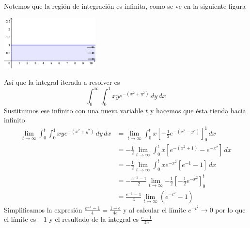 \documentclass{article}
\begin{document}
\begin{enumerate}
{{            \color{azul}
            Notemos que la región de integración es infinita, como se ve en la
            siguiente figura
            \begin{center}
                \includegraphics[width=5cm]{img/ej8.png}
            \end{center}
            Así que la integral iterada a resolver es
            \[
                \int_{0}^{\infty}{
                    \int_{0}^{1}{
                        xye^{-(x^2+y^2)}
                    \,dy}
                \,dx}
            \]
            Sustituimos ese infinito con una nueva variable $t$ y hacemos que
            ésta tienda hacia infinito
            \begin{align*}
                \lim_{t\to\infty}{
                    \int_{0}^{t}{
                        \int_{0}^{1}{
                            xye^{-(x^2+y^2)}
                        \,dy}
                    \,dx}
                }
                &=\lim_{t\to\infty}{
                    \int_{0}^{t}{
                        x\left[-\frac{1}{2}e^{-(x^2-y^2)}\right]_0^1
                    \,dx}
                }\\[.3cm]
                &=-\frac{1}{2}\lim_{t\to\infty}{
                    \int_{0}^{t}{
                        x\left[e^{-(x^2+1)}-e^{-x^2}\right]
                    \,dx}
                }\\[.3cm]
                &=-\frac{1}{2}\lim_{t\to\infty}{
                    \int_{0}^{t}{
                        xe^{-x^2}\left[e^{-1}-1\right]
                    \,dx}
                }\\[.3cm]
                &=-\frac{e^{-1}-1}{2}\lim_{t\to\infty}{
                    -\frac{1}{2}\left[-\frac{1}{2}e^{-x^2}\right]_{0}^{t}
                }\\[.3cm]
                &=\frac{e^{-1}-1}{4}\lim_{t\to\infty}{
                    \left(e^{-t^2}-1\right)
                }
            \end{align*}
            Simplificamos la expresión $\frac{e^{-1}-1}{4}=\frac{1-e}{4e}$ y al
            calcular el límite $e^{-t^2}\to 0$ por lo que el límite es
            $-1$ y el resultado de la integral es $\displaystyle\frac{e-1}{4e}$
        }
       }
    \end{enumerate}
\end{document}
